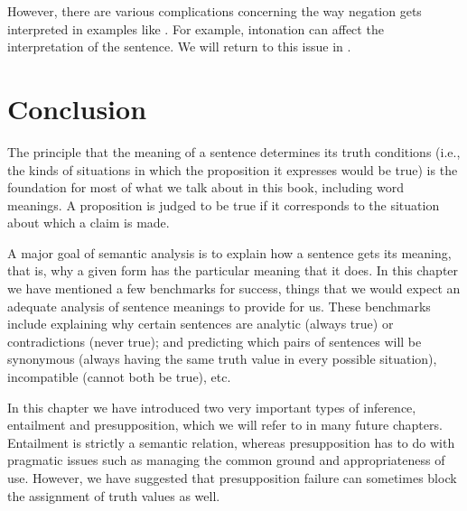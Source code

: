 However, there are various complications concerning the way negation gets interpreted in examples like . For example, intonation can affect the interpretation of the sentence. We will return to this issue in .


\section{Conclusion}\label{sec:3.5}\largerpage

The principle that the meaning of a sentence determines its truth conditions (i.e., the kinds of situations in which the proposition it expresses would be true) is the foundation for most of what we talk about in this book, including word meanings. A proposition is judged to be true if it corresponds to the situation about which a claim is made.



A major goal of semantic analysis is to explain how a sentence gets its meaning, that is, why a given form has the particular meaning that it does. In this chapter we have mentioned a few benchmarks for success, things that we would expect an adequate analysis of sentence meanings to provide for us. These benchmarks include explaining why certain sentences are analytic (always true) or contradictions (never true); and predicting which pairs of sentences will be synonymous (always having the same truth value in every possible situation), incompatible (cannot both be true), etc.



In this chapter we have introduced two very important types of inference, entailment and presupposition, which we will refer to in many future chapters. Entailment is strictly a semantic relation, whereas presupposition has to do with pragmatic issues such as managing the common ground and appropriateness of use. However, we have suggested that presupposition failure can sometimes block the assignment of truth values as well.




